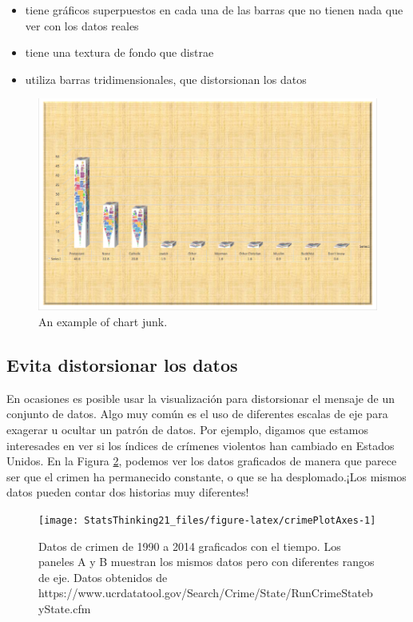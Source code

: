 \documentclass[
  12pt,
]{book}
\providecommand{\tightlist}{%
  \setlength{\itemsep}{0pt}\setlength{\parskip}{0pt}}
\theoremstyle{definition}
\theoremstyle{definition}
\theoremstyle{definition}
\theoremstyle{remark}
\begin{document}
\begin{itemize}
\tightlist
\item
  tiene gráficos superpuestos en cada una de las barras que no tienen nada que ver con los datos reales
\item
  tiene una textura de fondo que distrae
\item
  utiliza barras tridimensionales, que distorsionan los datos
\end{itemize}

\begin{figure}
\includegraphics[width=0.8\linewidth,height=0.5\textheight]{images/excel_chartjunk} \caption{An example of chart junk.}\label{fig:chartJunk}
\end{figure}

\hypertarget{evita-distorsionar-los-datos}{%
\subsection{Evita distorsionar los datos}\label{evita-distorsionar-los-datos}}

En ocasiones es posible usar la visualización para distorsionar el mensaje de un conjunto de datos. Algo muy común es el uso de diferentes escalas de eje para exagerar u ocultar un patrón de datos. Por ejemplo, digamos que estamos interesades en ver si los índices de crímenes violentos han cambiado en Estados Unidos. En la Figura \ref{fig:crimePlotAxes}, podemos ver los datos graficados de manera que parece ser que el crimen ha permanecido constante, o que se ha desplomado.¡Los mismos datos pueden contar dos historias muy diferentes!

\begin{figure}
\texttt{[image: StatsThinking21\_files/figure-latex/crimePlotAxes-1]} \caption{Datos de crimen de 1990 a 2014 graficados con el tiempo. Los paneles A y B muestran los mismos datos pero con diferentes rangos de eje. Datos obtenidos de https://www.ucrdatatool.gov/Search/Crime/State/RunCrimeStatebyState.cfm}\label{fig:crimePlotAxes}
\end{figure}
\end{document}
